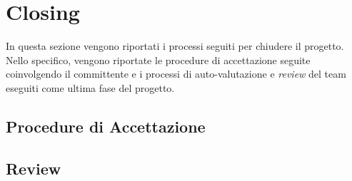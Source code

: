 \section{Closing}
\label{sec:closing}

In questa sezione vengono riportati i processi seguiti per chiudere il progetto. Nello specifico, vengono riportate le procedure di accettazione seguite coinvolgendo il committente e i processi di auto-valutazione e \textit{review} del team eseguiti come ultima fase del progetto.

\subsection{Procedure di Accettazione}

\subsection{Review}
